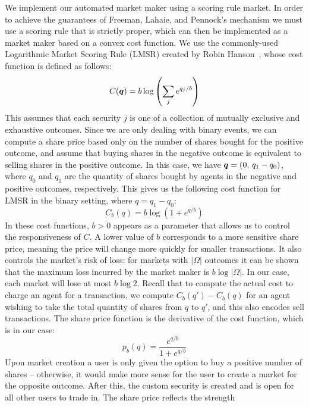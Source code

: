 We implement our automated market maker using a scoring rule market.  In order
to achieve the guarantees of Freeman, Lahaie, and Pennock's mechanism we must
use a scoring rule that is strictly proper, which can then be implemented as a
market maker based on a convex cost function. We use the commonly-used
Logarithmic Market Scoring Rule (LMSR) created by Robin
Hanson~\cite{Hanson2007}, whose cost function is defined as follows:
%
\begin{equation}
	\label{eq:LMSR}
	C(\bm{q}) = b \log \left( \sum_j e^{q_j/b} \right)
\end{equation}
%
This assumes that each security $j$ is one of a collection of mutually
exclusive and exhaustive outcomes. Since we are only dealing with binary
events, we can compute a share price based only on the number of shares bought
for the positive outcome, and assume that buying shares in the negative outcome
is equivalent to selling shares in the positive outcome. In this case, we have
$\bm{q}=( 0 , \, q_1 - q_0 )$, where $q_0$ and $q_1$ are the quantity of
shares bought by agents in the negative and positive outcomes, respectively.
This gives us the following cost function for LMSR in the binary setting, where
$q=q_1-q_0$:
%
\begin{equation}
	\label{eq:LMSRbinary}
	C_b (q) = b \log (1 + e^{q/b})
\end{equation}
%
In these cost functions, $b>0$ appears as a parameter that allows us to control
the responsiveness of $C$. A lower value of $b$ corresponds to a more sensitive
share price, meaning the price will change more quickly for smaller
transactions. It also controls the market's risk of loss: for markets with
$|\Omega|$ outcomes it can be shown that the maximum loss incurred by the
market maker is $b \log |\Omega|$. In our case, each market will lose at most
$b \log 2$. Recall that to compute the actual cost to charge an agent for a
transaction, we compute $C_b(q')-C_b(q)$ for an agent wishing to take the total
quantity of shares from $q$ to $q'$, and this also encodes sell transactions.
The share price function is the derivative of the cost function, which is in
our case:
%
\begin{equation}
	\label{eq:LMSRprice}
	p_b(q) = \frac{e^{q/b}}{1+e^{q/b}}
\end{equation}
%
Upon market creation a user is only given the option to buy a positive number
of shares -- otherwise, it would make more sense for the user to create a
market for the opposite outcome. After this, the custom security is created and
is open for all other users to trade in. The share price reflects the strength
